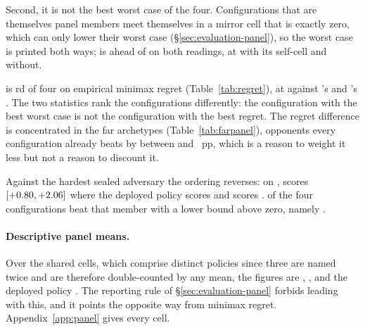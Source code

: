 Second, it is not the best worst case of the four. Configurations that are themselves panel
members meet themselves in a mirror cell that is exactly zero, which can only lower their worst
case (\S\ref{sec:evaluation-panel}), so the worst case is printed both ways; \composite{} is ahead
of \sestina{} on both readings, at \vsevenWorstComposite{} with its self-cell and
\vsevenWorstCompositeExSelf{} without.

\begin{table}[!ht]\centering
\caption{Empirical minimax regret over the shared panel (\S\ref{sec:evaluation-panel}), in
percentage points of win-rate edge on pooled point estimates, best first, with the panel member at
which each configuration's largest shortfall from the best of the four is attained. No interval is
attached to this statistic. The protocol sets no threshold on it and requires only that it be
reported.}
\label{tab:regret}
{\tabfont}
\end{table}

\sestina{} is \vsevenRegretFrozenRank{}rd of four on empirical minimax regret
(Table~\ref{tab:regret}), at \vsevenRegretFrozen{} against \vsevenRegretBest{}'s
\vsevenRegretFcheap{} and \composite{}'s \vsevenRegretComposite{}. The two statistics rank the
configurations differently: the configuration with the best worst case is not the configuration
with the best regret. The regret difference is concentrated in the far archetypes
(Table~\ref{tab:farpanel}), opponents every configuration already beats by between
\vsevenFarSpanLo{} and \vsevenFarSpanHi{}~pp, which is a reason to weight it less but not a reason
to discount it.

\begin{table}[!ht]\centering
\caption{The far archetypes, where the minimax-regret differences are concentrated.}
\label{tab:farpanel}
{\tabfont}
\end{table}

Against the hardest sealed adversary the ordering reverses: on
\texttt{\vsevenHardSealed{}}, \sestina{} scores \vsevenHardFrozen{}
$[+0.80, +2.06]$ where the deployed policy scores
\vsevenHardIncumbent{} and \fcheap{} scores \vsevenHardFcheap{}. \vsevenHardBeaters{} of the four
configurations beat that member with a lower bound above zero, namely \vsevenHardBeaterNames{}.

\paragraph{Descriptive panel means.} Over the \vsevenPanelMembers{} shared cells, which comprise
\vsevenPanelDistinct{} distinct policies since three are named twice and are therefore
double-counted by any mean, the figures are \sestina{} \vsevenPanelMeanFrozen{},
\composite{} \vsevenPanelMeanComposite{}, \fcheap{} \vsevenPanelMeanFcheap{} and the deployed policy
\vsevenPanelMeanIncumbent{}. The reporting rule of \S\ref{sec:evaluation-panel} forbids leading with
this, and it points the opposite way from minimax regret. Appendix~\ref{app:panel} gives every cell.

